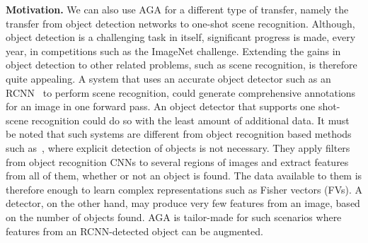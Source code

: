 \documentclass[10pt,twocolumn,letterpaper]{article}
\begin{document}
\begin{table}[t!]
\small
{}
\caption{\label{table:oneshot_scenes} \footnotesize{
\textit{One-shot scene classification} on a set of 25 Indoor scene classes
\cite{dset:MITIndoor}: \{auditorium, bakery, bedroom, bookstore, children room, classroom, computer room, concert hall, corridor, dental office, dining room, hospital room, laboratory, library, living room, lobby, meeting room, movie theater, nursery, office, operating room, pantry, restaurant\}}.}
\end{table}

\noindent
\textbf{Motivation.} We can also use AGA for a different type of 
transfer, namely the transfer from object detection networks to 
one-shot scene recognition. Although, object detection is a challenging 
task in itself, significant progress is made, every year, 
in competitions such as the ImageNet challenge. Extending the gains 
in object detection to other related problems, such as scene recognition, 
is therefore quite appealing. A system that uses 
an accurate object detector such as an RCNN~\cite{Girshick15a} to perform 
scene recognition, could generate comprehensive annotations for an 
image in one forward pass. An object detector that supports one shot-scene 
recognition could do so with the least amount of additional data. 
It must be noted that such systems are different from object recognition 
based methods such as~\cite{Gong14a,Dixit15a,Cimpoi15a}, where explicit 
detection of objects is not necessary. They apply filters from object 
recognition CNNs to several regions of images and extract features from 
all of them, whether or not an object is found. The data available to 
them is therefore enough to learn complex representations 
such as Fisher vectors (FVs). A detector, on the other hand, may produce 
very few features from an image, based on the number of objects found. 
AGA is tailor-made for such scenarios where 
features from an RCNN-detected object can be augmented.
\end{document}
